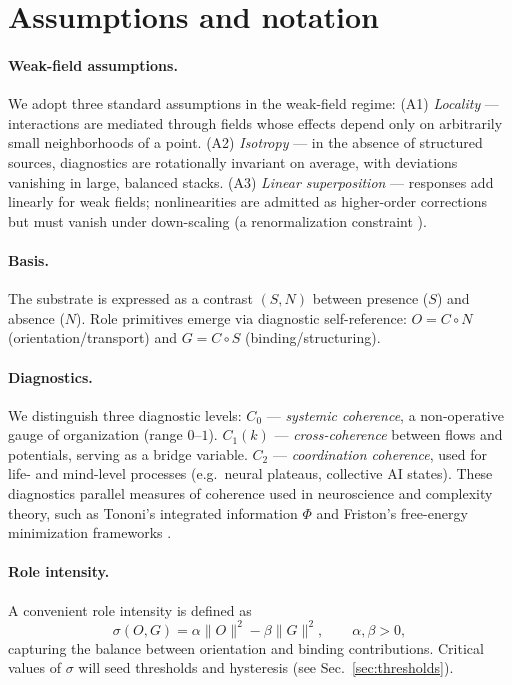 \documentclass[12pt,a4paper,oneside]{scrreprt}
\begin{document}
\section{Assumptions and notation}\label{sec:ur-assumptions}

\paragraph{Weak-field assumptions.} 
We adopt three standard assumptions in the weak-field regime:  
(A1) \emph{Locality} --- interactions are mediated through fields whose effects depend only on arbitrarily small neighborhoods of a point.  
(A2) \emph{Isotropy} --- in the absence of structured sources, diagnostics are rotationally invariant on average, with deviations vanishing in large, balanced stacks.  
(A3) \emph{Linear superposition} --- responses add linearly for weak fields; nonlinearities are admitted as higher-order corrections but must vanish under down-scaling (a renormalization constraint \citep{Wilson1971RG,Kadanoff1966}).  

\paragraph{Basis.} 
The substrate is expressed as a contrast $(S,N)$ between presence ($S$) and absence ($N$). 
Role primitives emerge via diagnostic self-reference: 
$O = C \circ N$ (orientation/transport) and $G = C \circ S$ (binding/structuring).  

\paragraph{Diagnostics.} 
We distinguish three diagnostic levels:  
$C_0$ --- \emph{systemic coherence}, a non-operative gauge of organization (range $0$–$1$).  
$C_1(k)$ --- \emph{cross-coherence} between flows and potentials, serving as a bridge variable.  
$C_2$ --- \emph{coordination coherence}, used for life- and mind-level processes (e.g.\ neural plateaus, collective AI states).  
These diagnostics parallel measures of coherence used in neuroscience and complexity theory, such as Tononi’s integrated information $\Phi$ \citep{Tononi2004IIT} and Friston’s free-energy minimization frameworks \citep{Friston2010FEP}.

\paragraph{Role intensity.} 
A convenient role intensity is defined as
\begin{equation}
\sigma(O,G) = \alpha \|O\|^2 - \beta \|G\|^2, 
\qquad \alpha,\beta>0,
\end{equation}
capturing the balance between orientation and binding contributions. 
Critical values of $\sigma$ will seed thresholds and hysteresis (see Sec.~\ref{sec:thresholds}).
\end{document}

